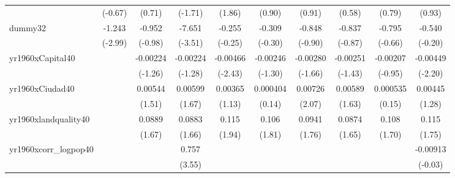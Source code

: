 {\begin{tabular}{l*{9}{c}}
            &     (-0.67)         &      (0.71)         &     (-1.71)         &      (1.86)         &      (0.90)         &      (0.91)         &      (0.58)         &      (0.79)         &      (0.93)         \\
[1em]
dummy32     &      -1.243\sym{**} &      -0.952         &      -7.651\sym{***}&      -0.255         &      -0.309         &      -0.848         &      -0.837         &      -0.795         &      -0.540         \\
            &     (-2.99)         &     (-0.98)         &     (-3.51)         &     (-0.25)         &     (-0.30)         &     (-0.90)         &     (-0.87)         &     (-0.66)         &     (-0.20)         \\
[1em]
yr1960xCapital40&                     &    -0.00224         &    -0.00224         &    -0.00466\sym{*}  &    -0.00246         &    -0.00280         &    -0.00251         &    -0.00207         &    -0.00449\sym{*}  \\
            &                     &     (-1.26)         &     (-1.28)         &     (-2.43)         &     (-1.30)         &     (-1.66)         &     (-1.43)         &     (-0.95)         &     (-2.20)         \\
[1em]
yr1960xCiudad40&                     &     0.00544         &     0.00599         &     0.00365         &    0.000404         &     0.00726\sym{*}  &     0.00589         &    0.000535         &     0.00445         \\
            &                     &      (1.51)         &      (1.67)         &      (1.13)         &      (0.14)         &      (2.07)         &      (1.63)         &      (0.15)         &      (1.28)         \\
[1em]
yr1960xlandquality40&                     &      0.0889         &      0.0883         &       0.115         &       0.106         &      0.0941         &      0.0874         &       0.108         &       0.115         \\
            &                     &      (1.67)         &      (1.66)         &      (1.94)         &      (1.81)         &      (1.76)         &      (1.65)         &      (1.70)         &      (1.75)         \\
[1em]
yr1960xcorr\_logpop40&                     &                     &       0.757\sym{***}&                     &                     &                     &                     &                     &    -0.00913         \\
            &                     &                     &      (3.55)         &                     &                     &                     &                     &                     &     (-0.03)         \\

\end{tabular}}
